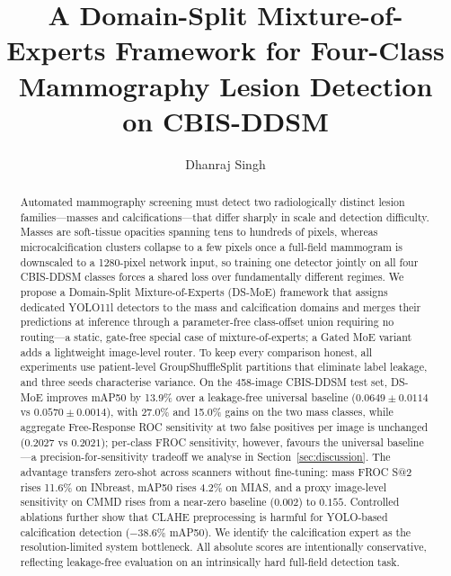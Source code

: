 \documentclass[runningheads]{llncs}
\begin{document}
\title{A Domain-Split Mixture-of-Experts Framework for
Four-Class Mammography Lesion Detection on CBIS-DDSM}


\author{Dhanraj Singh}



\maketitle

\begin{abstract}
Automated mammography screening must detect two radiologically distinct
lesion families---masses and calcifications---that differ sharply in
scale and detection difficulty. Masses are soft-tissue opacities
spanning tens to hundreds of pixels, whereas microcalcification clusters
collapse to a few pixels once a full-field mammogram is downscaled to a
1280-pixel network input, so training one detector jointly on all four
CBIS-DDSM classes forces a shared loss over fundamentally different
regimes. We propose a Domain-Split Mixture-of-Experts (DS-MoE) framework
that assigns dedicated YOLO11l detectors to the mass and calcification
domains and merges their predictions at inference through a
parameter-free class-offset union requiring no routing---a static,
gate-free special case of mixture-of-experts; a Gated MoE variant adds
a lightweight image-level router. To keep every comparison honest, all
experiments use patient-level GroupShuffleSplit partitions that
eliminate label leakage, and three seeds characterise variance. On the
458-image CBIS-DDSM test set, DS-MoE improves mAP50 by 13.9\% over a
leakage-free universal baseline ($0.0649 \pm 0.0114$ vs
$0.0570 \pm 0.0014$), with 27.0\% and 15.0\% gains on the two mass
classes, while aggregate Free-Response ROC sensitivity at two false
positives per image is unchanged ($0.2027$ vs $0.2021$); per-class FROC
sensitivity, however, favours the universal baseline---a
precision-for-sensitivity tradeoff we analyse in
Section~\ref{sec:discussion}. The advantage transfers zero-shot across
scanners without fine-tuning: mass FROC S@2 rises 11.6\% on INbreast,
mAP50 rises 4.2\% on MIAS, and a proxy image-level sensitivity on CMMD
rises from a near-zero baseline ($0.002$) to $0.155$. Controlled ablations further show
that CLAHE preprocessing is harmful for YOLO-based calcification
detection ($-38.6\%$ mAP50). We identify the calcification expert as the
resolution-limited system bottleneck. All absolute scores are
intentionally conservative, reflecting leakage-free evaluation on an
intrinsically hard full-field detection task.
\end{abstract}
\end{document}
